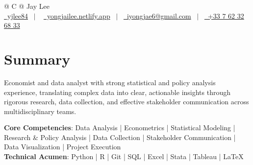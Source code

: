 \documentclass[a4paper,12pt]{article}
\begin{document}
\pagestyle{empty} 



\begin{tabularx}{\linewidth}{@{} C @{}}
\Huge{Jay Lee} \\[7.5pt]
\href{https://github.com/yjlee84}{\raisebox{-0.05\height}\faGithub\ yjlee84} \ $|$ \ 
\href{https://yongjailee.netlify.app}{\raisebox{-0.05\height}\faGlobe \ yongjailee.netlify.app} \ $|$ \ 
\href{mailto:email@mysite.com}{\raisebox{-0.05\height}\faEnvelope \ iyongjae6@gmail.com} \ $|$ \ 
\href{tel:+000000000000}{\raisebox{-0.05\height}\faMobile \ +33 7 62 32 68 33} \\
\end{tabularx}


\section{Summary}
Economist and data analyst with strong statistical and policy analysis experience, translating complex data into clear, actionable insights through rigorous research, data collection, and effective stakeholder communication across multidisciplinary teams.

\textbf{Core Competencies}: Data Analysis | Econometrics | Statistical Modeling | Research \& Policy Analysis | Data Collection | Stakeholder Communication | Data Visualization | Project Execution\\
\textbf{Technical Acumen}: Python | R | Git | SQL | Excel | Stata | Tableau | \LaTeX{}
\end{document}
